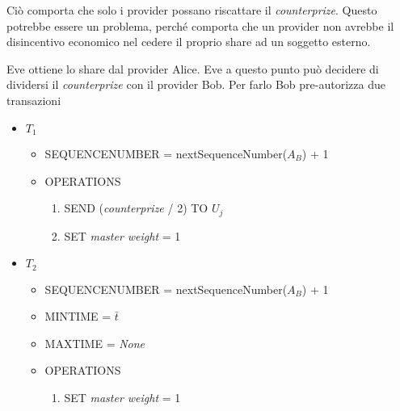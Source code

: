 Ciò comporta che solo i provider possano riscattare il \textit{counterprize}. Questo potrebbe
essere un problema, perché comporta che un provider non avrebbe il disincentivo economico
nel cedere il proprio share ad un soggetto esterno.

Eve ottiene lo share dal provider Alice. Eve a questo punto può decidere di dividersi
il \textit{counterprize} con il provider Bob. Per farlo Bob pre-autorizza due transazioni

\begin{itemize}
	\item $ T_1 $
	      \begin{itemize}
		      \item SEQUENCE\textunderscore NUMBER = nextSequenceNumber($ A_B $) + 1
		      \item OPERATIONS
		            \begin{enumerate}
			            \item SEND (\textit{counterprize} / 2) TO $ U_j $
			            \item SET \textit{master weight} = 1
		            \end{enumerate}
	      \end{itemize}
\end{itemize}
\begin{itemize}
	\item $ T_2 $
	      \begin{itemize}
		      \item SEQUENCE\textunderscore NUMBER = nextSequenceNumber($ A_B $) + 1
		      \item MIN\textunderscore TIME = $ \bar{t} $
		      \item MAX\textunderscore TIME =  \textit{None}
		      \item OPERATIONS
		            \begin{enumerate}
			            \item SET \textit{master weight} = 1
		            \end{enumerate}
	      \end{itemize}
\end{itemize}

